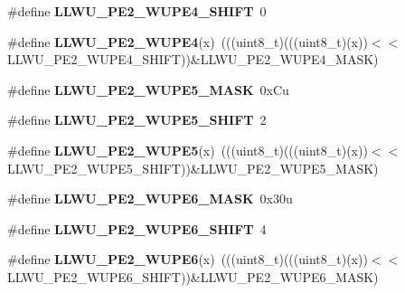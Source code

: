 \begin{DoxyCompactItemize}
\#define {\bfseries L\+L\+W\+U\+\_\+\+P\+E2\+\_\+\+W\+U\+P\+E4\+\_\+\+S\+H\+I\+FT}~0
\item 
\mbox{\label{group___l_l_w_u___register___masks_gadd7ab2866ab9683237ee5d6c003cf2aa}} 
\#define {\bfseries L\+L\+W\+U\+\_\+\+P\+E2\+\_\+\+W\+U\+P\+E4}(x)~(((uint8\+\_\+t)(((uint8\+\_\+t)(x))$<$$<$L\+L\+W\+U\+\_\+\+P\+E2\+\_\+\+W\+U\+P\+E4\+\_\+\+S\+H\+I\+FT))\&L\+L\+W\+U\+\_\+\+P\+E2\+\_\+\+W\+U\+P\+E4\+\_\+\+M\+A\+SK)
\item 
\mbox{\label{group___l_l_w_u___register___masks_gacfb855231e7a1c11c64d8b4e951817be}} 
\#define {\bfseries L\+L\+W\+U\+\_\+\+P\+E2\+\_\+\+W\+U\+P\+E5\+\_\+\+M\+A\+SK}~0x\+Cu
\item 
\mbox{\label{group___l_l_w_u___register___masks_ga4e823ada9bfc21dca4729eedf4e63778}} 
\#define {\bfseries L\+L\+W\+U\+\_\+\+P\+E2\+\_\+\+W\+U\+P\+E5\+\_\+\+S\+H\+I\+FT}~2
\item 
\mbox{\label{group___l_l_w_u___register___masks_ga956b7d4a8e1a041de809612c0cad83e3}} 
\#define {\bfseries L\+L\+W\+U\+\_\+\+P\+E2\+\_\+\+W\+U\+P\+E5}(x)~(((uint8\+\_\+t)(((uint8\+\_\+t)(x))$<$$<$L\+L\+W\+U\+\_\+\+P\+E2\+\_\+\+W\+U\+P\+E5\+\_\+\+S\+H\+I\+FT))\&L\+L\+W\+U\+\_\+\+P\+E2\+\_\+\+W\+U\+P\+E5\+\_\+\+M\+A\+SK)
\item 
\mbox{\label{group___l_l_w_u___register___masks_ga0db50e96153e1ca74874da97d1c22f41}} 
\#define {\bfseries L\+L\+W\+U\+\_\+\+P\+E2\+\_\+\+W\+U\+P\+E6\+\_\+\+M\+A\+SK}~0x30u
\item 
\mbox{\label{group___l_l_w_u___register___masks_gaa7a0191eaf60166333a8bee953239c85}} 
\#define {\bfseries L\+L\+W\+U\+\_\+\+P\+E2\+\_\+\+W\+U\+P\+E6\+\_\+\+S\+H\+I\+FT}~4
\item 
\mbox{\label{group___l_l_w_u___register___masks_gaa96b35faf789a4b85552957c8227c1e0}} 
\#define {\bfseries L\+L\+W\+U\+\_\+\+P\+E2\+\_\+\+W\+U\+P\+E6}(x)~(((uint8\+\_\+t)(((uint8\+\_\+t)(x))$<$$<$L\+L\+W\+U\+\_\+\+P\+E2\+\_\+\+W\+U\+P\+E6\+\_\+\+S\+H\+I\+FT))\&L\+L\+W\+U\+\_\+\+P\+E2\+\_\+\+W\+U\+P\+E6\+\_\+\+M\+A\+SK)
$$
\end{DoxyCompactItemize}
